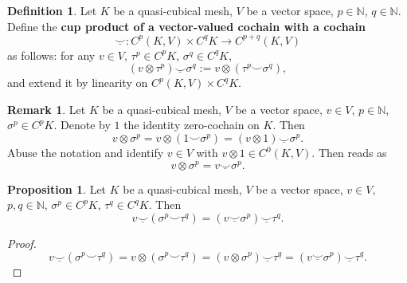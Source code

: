 \documentclass[fleqn]{article}
\theoremstyle{definition}
\newtheorem{proposition}[theorem]{Proposition}
\newtheorem{definition}[theorem]{Definition}
\newtheorem{remark}[theorem]{Remark}
\newcommand{\N}{\mathbb{N}}
\newcommand{\usmile}{\underline{\smile}}
\begin{document}
\begin{definition}
  Let
    $K$ be a quasi-cubical mesh,
    $V$ be a vector space,
    $p \in \N$,
    $q \in \N$.
  Define the \textbf{cup product of a vector-valued cochain with a cochain}
  \begin{equation}
    \usmile \colon C^p(K, V) \times C^q K \to C^{p + q}(K, V)
  \end{equation}
  as follows: for any $v \in V$, $\tau^p \in C^p K$, $\sigma^q \in C^q K$,
  \begin{equation}
    (v \otimes \tau^p) \usmile \sigma^q := v \otimes (\tau^p \smile \sigma^q),
  \end{equation}
  and extend it by linearity on $C^p(K, V) \times C^q K$.
\end{definition}

\begin{remark}
  Let
    $K$ be a quasi-cubical mesh,
    $V$ be a vector space,
    $v \in V$,
    $p \in \N$,
    $\sigma^p \in C^p K$.
  Denote by $1$ the identity zero-cochain on $K$.
  Then
  \begin{equation}
  \label{idec:tensor_to_cup:equation}
    v \otimes \sigma^p
    = v \otimes (1 \smile \sigma^p)
    = (v \otimes 1) \usmile \sigma^p.
  \end{equation}
  Abuse the notation and identify $v \in V$ with $v \otimes 1 \in C^0(K, V)$.
  Then  reads as
  \begin{equation}
    v \otimes \sigma^p = v \usmile \sigma^p.
  \end{equation}
\end{remark}

\begin{proposition}
  Let
    $K$ be a quasi-cubical mesh,
    $V$ be a vector space, $v \in V$,
    $p, q \in \N$,
    $\sigma^p \in C^p K$, 
    $\tau^q \in C^q K$.
  Then
  \begin{equation}
    v \usmile (\sigma^p \smile \tau^q) = (v \usmile \sigma^p) \usmile \tau^q.
  \end{equation}
\end{proposition}

\begin{proof}
  \begin{equation}
    v \usmile (\sigma^p \smile \tau^q)
    = v \otimes (\sigma^p \smile \tau^q)
    = (v \otimes \sigma^p) \usmile \tau^q
    = (v \usmile \sigma^p) \usmile \tau^q.
  \end{equation}
\end{proof}
\end{document}
